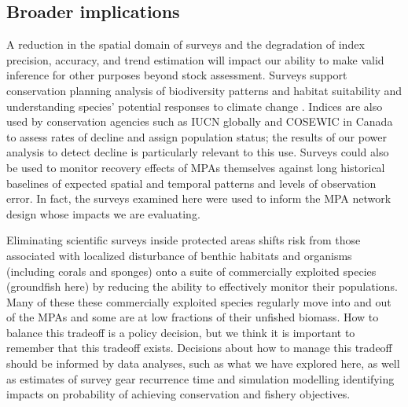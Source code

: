 \documentclass[12pt]{article}
\newcommand{\R}[1]{\label{#1}\linelabel{#1}}
\begin{document}
\begin{spacing}{1.4}
\subsection*{Broader implications}

\R{E2a}A reduction in the spatial domain of surveys and the degradation of index precision, accuracy, and trend estimation will impact our ability to make valid inference for other purposes beyond stock assessment.
Surveys support conservation planning analysis of biodiversity patterns and habitat suitability \citep[e.g.,][]{rubidge2016, thompson2022meps} and understanding species' potential responses to climate change \citep[e.g.,][]{english2021, thompson2023warming}.
Indices are also used by conservation agencies such as IUCN globally \citep{iucn2012} and COSEWIC in Canada \citep{cosewicTable2} to assess rates of decline and assign population status; the results of our power analysis to detect decline is particularly relevant to this use.
Surveys could also be used to monitor recovery effects of MPAs themselves against long historical baselines of expected spatial and temporal patterns and levels of observation error.
In fact, the surveys examined here were used to inform the MPA network design whose impacts we are evaluating.


Eliminating scientific surveys inside protected areas shifts risk from those associated with localized disturbance of benthic habitats and organisms (including corals and sponges) onto a suite of commercially exploited species (groundfish here) by reducing the ability to effectively monitor their populations.
Many of these these commercially exploited species regularly move into and out of the MPAs and some are at low fractions of their unfished biomass.
How to balance this tradeoff is a policy decision, but we think it is important to remember that this tradeoff exists.
Decisions about how to manage this tradeoff should be informed by data analyses, such as what we have explored here, as well as estimates of survey gear recurrence time \citep{benoit2020national} and simulation modelling identifying impacts on probability of achieving conservation and fishery objectives.


\end{spacing}
\end{document}
